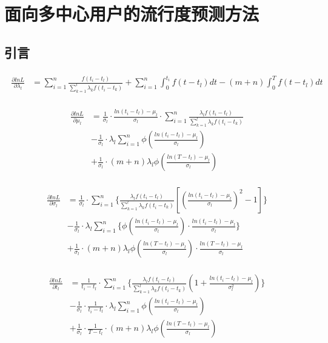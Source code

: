 \chapter{面向多中心用户的流行度预测方法}
\label{chap:four}
\section{引言}
\begin{eqnarray}
\label{eq:gradLambda}
\begin{split}
\frac{\partial lnL}{\partial \lambda_l} & = \sum_{i=1}^{n}\frac{f(t_i-t_l)}{\sum_{k=1}^{l} \lambda_k f(t_i-t_k)} + \sum_{i=1}^{n} \int_{0}^{t_i}f(t-t_l)dt - (m+n)\int_{0}^{T}f(t-t_l)dt
\end{split}
\end{eqnarray}

\begin{eqnarray}
\label{eq:gradMu}
\begin{split}
\frac{\partial lnL}{\partial \mu_l} & = \frac{1}{\sigma_l} \cdot \frac{ln(t_i-t_l)-\mu_l}{\sigma_l} \cdot \sum_{i=1}^{n}\frac{\lambda_l f(t_i-t_l)}{\sum_{k=1}^{l} \lambda_k f(t_i-t_k)} \\
& - \frac{1}{\sigma_l} \cdot\lambda_l \sum_{i=1}^{n} \phi(\frac{ln(t_i-t_l)-\mu_l}{\sigma_l}) \\
& + \frac{1}{\sigma_l}\cdot (m+n)\lambda_l \phi(\frac{ln(T-t_l)-\mu_l}{\sigma_l})
\end{split}
\end{eqnarray}

\begin{eqnarray}
\label{eq:gradSigma}
\begin{split}
\frac{\partial lnL}{\partial \sigma_l} & = \frac{1}{\sigma_l} \cdot \sum_{i=1}^{n}\{\frac{\lambda_l f(t_i-t_l)}{\sum_{k=1}^{l} \lambda_k f(t_i-t_k)}[(\frac{ln(t_i-t_l)-\mu_l}{\sigma_l})^2-1]\} \\
& -\frac{1}{\sigma_l} \cdot \lambda_l\sum_{i=1}^{n}\{\phi(\frac{ln(t_i-t_l)-\mu_l}{\sigma_l}) \cdot \frac{ln(t_i-t_l)-\mu_l}{\sigma_l}\} \\
& + \frac{1}{\sigma_l} \cdot (m+n)\lambda_l \phi(\frac{ln(T-t_l)-\mu_l}{\sigma_l}) \cdot \frac{ln(T-t_l)-\mu_l}{\sigma_l}
\end{split}
\end{eqnarray}

\begin{eqnarray}
\label{eq:gradT}
\begin{split}
\frac{\partial lnL}{\partial t_l} &= \frac{1}{t_i-t_l} \cdot \sum_{i=1}^{n}\{ \frac{\lambda_l f(t_i-t_l)}{\sum_{k=1}^l\lambda_kf(t_i-t_k)}(1+\frac{ln(t_i-t_l)-\mu_l}{\sigma_l^2}) \} \\
& -\frac{1}{\sigma_l} \cdot \frac{1}{t_i-t_l}\cdot \lambda_l\sum_{i=1}^{n} \phi(\frac{ln(t_i-t_l)-\mu_l}{\sigma_l}) \\
& +\frac{1}{\sigma_l}\cdot \frac{1}{T-t_l}\cdot (m+n)\lambda_l\phi(\frac{ln(T-t_l)-\mu_l}{\sigma_l})
\end{split}
\end{eqnarray}